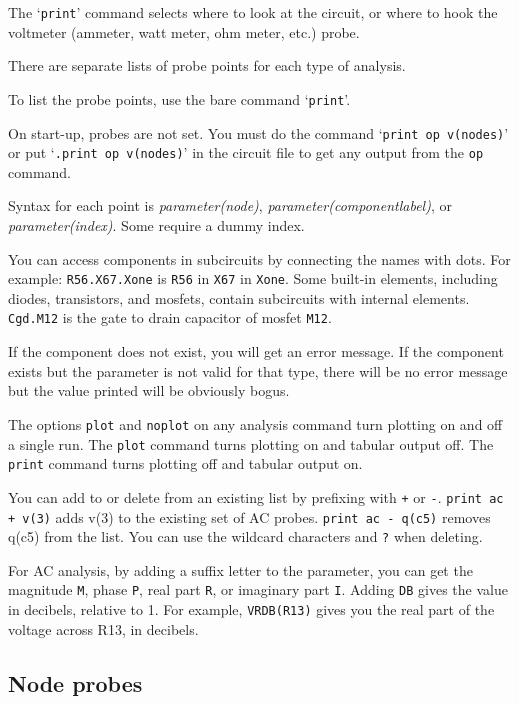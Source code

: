 The `{\tt print}' command selects where to look at the circuit, or where to
hook the voltmeter (ammeter, watt meter, ohm meter, etc.) probe.

There are separate lists of probe points for each type of analysis.

To list the probe points, use the bare command `{\tt print}'.

On start-up, probes are not set.  You must do the command `{\tt print op
v(nodes)}' or put `{\tt .print op v(nodes)}' in the circuit file to get any
output from the {\tt op} command.

Syntax for each point is {\it parameter(node)}, {\it
parameter(componentlabel)}, or {\it parameter(index)}.  Some require a
dummy index.

You can access components in subcircuits by connecting the names with dots.
For example: {\tt R56.X67.Xone} is {\tt R56} in {\tt X67} in {\tt Xone}.
Some built-in elements, including diodes, transistors, and mosfets, contain
subcircuits with internal elements.  {\tt Cgd.M12} is the gate to drain
capacitor of mosfet {\tt M12}.

If the component does not exist, you will get an error message.  If the
component exists but the parameter is not valid for that type, there will be
no error message but the value printed will be obviously bogus.

The options {\tt plot} and {\tt noplot} on any analysis command turn
plotting on and off a single run.  The {\tt plot} command turns 
plotting on and tabular output off.  The {\tt print} command turns plotting 
off and tabular output on.

You can add to or delete from an existing list by prefixing with
{\tt +} or {\tt -}.  {\tt print ac + v(3)} adds v(3) to the existing
set of AC probes.  {\tt print ac - q(c5)} removes q(c5) from the
list.  You can use the wildcard characters {\tt *} and {\tt ?} when
deleting.

For AC analysis, by adding a suffix letter to the parameter, you can
get the magnitude {\tt M}, phase {\tt P}, real part {\tt R}, or
imaginary part {\tt I}.  Adding {\tt DB} gives the value in decibels,
relative to 1.  For example, {\tt VRDB(R13)} gives you the real part
of the voltage across R13, in decibels.
\subsection{Node probes}

